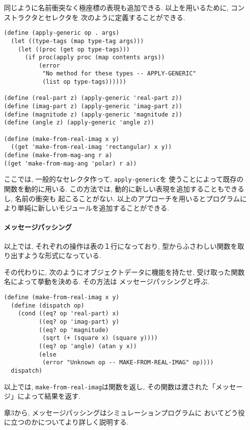 同じように名前衝突なく極座標の表現も追加できる.
以上を用いるために, コンストラクタとセレクタを
次のように定義することができる.

\begin{lstlisting}[basicstyle=\scriptsize]
(define (apply-generic op . args)
  (let ((type-tags (map type-tag args)))
    (let ((proc (get op type-tags)))
      (if proc(apply proc (map contents args))
          (error
           "No method for these types -- APPLY-GENERIC"
           (list op type-tags))))))

(define (real-part z) (apply-generic 'real-part z))
(define (imag-part z) (apply-generic 'imag-part z))
(define (magnitude z) (apply-generic 'magnitude z))
(define (angle z) (apply-generic 'angle z))

(define (make-from-real-imag x y)
  ((get 'make-from-real-imag 'rectangular) x y))
(define (make-from-mag-ang r a)
((get 'make-from-mag-ang 'polar) r a))
\end{lstlisting}

ここでは, 一般的なセレクタ作って, \lstinline{apply-generic}を
使うことによって既存の関数を動的に用いる. この方法では,
動的に新しい表現を追加することもできるし, 名前の衝突も
起こることがない. 以上のアプローチを用いるとプログラムに
より単純に新しいモジュールを追加することができる.

\paragraph{メッセージパッシング}
以上では, それぞれの操作は表の１行になっており,
型からふさわしい関数を取り出すような形式になっている.

その代わりに, 次のようにオブジェクトデータに機能を持たせ,
受け取った関数名によって挙動を決める. その方法は
メッセージパッシングと呼ぶ.

\begin{lstlisting}[basicstyle=\footnotesize]
(define (make-from-real-imag x y)
  (define (dispatch op)
    (cond ((eq? op 'real-part) x)
          ((eq? op 'imag-part) y)
          ((eq? op 'magnitude)
           (sqrt (+ (square x) (square y))))
          ((eq? op 'angle) (atan y x))
          (else
           (error "Unknown op -- MAKE-FROM-REAL-IMAG" op))))
  dispatch)
\end{lstlisting}

以上では, \lstinline{make-from-real-imag}は関数を返し,
その関数は渡された「メッセージ」によって結果を返す.

章3から, メッセージパッシングはシミュレーションプログラムに
おいてどう役に立つのかについてより詳しく説明する.
